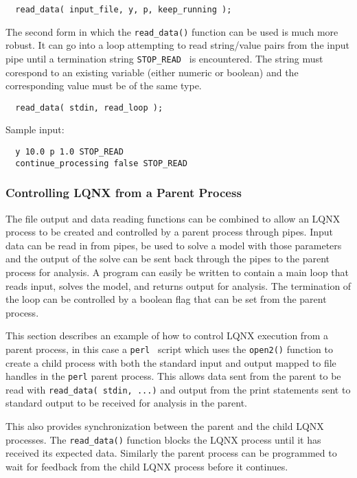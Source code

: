 \lstset{language=C++}
\begin{lstlisting}
  read_data( input_file, y, p, keep_running );
\end{lstlisting}

The second form  in which the {\tt read\_data()} function can be used is much more robust. It can go into a loop
attempting to read string/value pairs from the input pipe until a termination string {\tt STOP\_READ } is encountered.
The string must corespond to an existing \ModLang variable (either numeric or boolean) and the corresponding
value must be of the same type.  

\lstset{language=C++}
\begin{lstlisting}
  read_data( stdin, read_loop );
\end{lstlisting}

Sample input:

\lstset{language=C++}
\begin{lstlisting}
  y 10.0 p 1.0 STOP_READ
  continue_processing false STOP_READ
\end{lstlisting}

\subsubsection{Controlling LQNX from a Parent Process}

The file output and data reading functions can be combined to allow an LQNX process to be created and controlled
by a parent process through pipes. Input data can be read in from pipes, be used to solve a model with those
parameters and the output of the solve can be sent back through the pipes to the parent process for analysis.
A \ModLang program can easily be written to contain a main loop that reads input, solves the model, and returns
output for analysis. The termination of the loop can be controlled by a boolean flag that can be set from the
parent process.

This section describes an example of how to control LQNX execution from a parent process, in this case a {\tt perl }
script which uses the {\tt open2()} function to create a child process with both the standard input and output
mapped to file handles in the {\tt perl} parent process. This allows data sent from the parent to be read with
{\tt read\_data( stdin, ...)} and output from the \ModLang print statements sent to standard output to be received for
analysis in the parent.

This also provides synchronization between the parent and the child
LQNX processes. The {\tt read\_data()} function
blocks the LQNX process until it has received its expected data. Similarly the parent process can be programmed
to wait for feedback from the child LQNX process before it continues.

